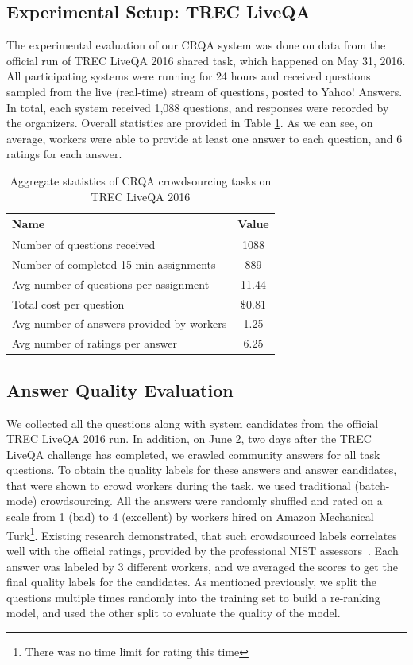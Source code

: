 \documentclass[letterpaper]{article}
\begin{document}
\subsection{Experimental Setup: TREC LiveQA}

The experimental evaluation of our CRQA system was done on data from the official run of TREC LiveQA 2016 shared task, which happened on May 31, 2016.
All participating systems were running for 24 hours and received questions sampled from the live (real-time) stream of questions, posted to Yahoo! Answers.
In total, each system received 1,088 questions, and responses were recorded by the organizers.
Overall statistics are provided in Table \ref{table:task_stats}.
As we can see, on average, workers were able to provide at least one answer to each question, and 6 ratings for each answer.

\begin{table}[ht]
\centering
\begin{tabular}{| p{6.7cm} | c | }
\hline
Name & Value \\
\hline
Number of questions received & 1088 \\
Number of completed 15 min assignments & 889 \\
Avg number of questions per assignment & 11.44 \\
Total cost per question & \$0.81 \\
Avg number of answers provided by workers & 1.25 \\
Avg number of ratings per answer & 6.25 \\
\hline
\end{tabular}
\caption{Aggregate statistics of CRQA crowdsourcing tasks on TREC LiveQA 2016}
\label{table:task_stats}
\end{table}

\subsection{Answer Quality Evaluation}
\label{sec:experiments:answer-quality-evaluation}

We collected all the questions along with system candidates from the official TREC LiveQA 2016 run.
In addition, on June 2, two days after the TREC LiveQA challenge has completed, we crawled community answers for all task questions.
To obtain the quality labels for these answers and answer candidates, that were shown to crowd workers during the task, we used traditional (batch-mode) crowdsourcing.
All the answers were randomly shuffled and rated on a scale from 1 (bad) to 4 (excellent) by workers hired on Amazon Mechanical Turk\footnote{There was no time limit for rating this time}.
Existing research demonstrated, that such crowdsourced labels correlates well with the official ratings, provided by the professional NIST assessors~\cite{savenkov_crowdsourcing2016a}.
Each answer was labeled by 3 different workers, and we averaged the scores to get the final quality labels for the candidates.
As mentioned previously, we split the questions multiple times randomly into the training set to build a re-ranking model, and used the other split to evaluate the quality of the model.
\end{document}
